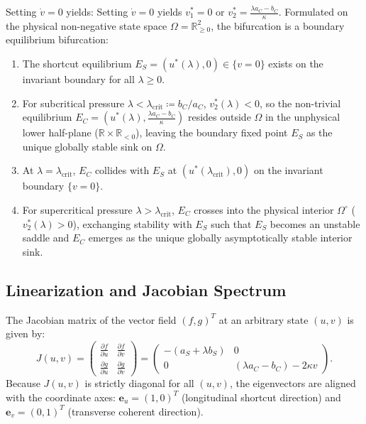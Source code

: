 \documentclass{article}
\theoremstyle{plain}
\theoremstyle{definition}
\begin{document}
Setting $\dot{v} = 0$ yields:
Setting $\dot{v} = 0$ yields $v_1^* = 0$ or $v_2^* = \frac{\lambda a_C - b_C}{\kappa}$. Formulated on the physical non-negative state space $\Omega = \mathbb{R}_{\ge 0}^2$, the bifurcation is a boundary equilibrium bifurcation:
\begin{enumerate}[leftmargin=*,noitemsep]
    \item The shortcut equilibrium $E_S = (u^*(\lambda), 0) \in \{v=0\}$ exists on the invariant boundary for all $\lambda \ge 0$.
    \item For subcritical pressure $\lambda < \lambda_{\text{crit}} \coloneqq b_C / a_C$, $v_2^*(\lambda) < 0$, so the non-trivial equilibrium $E_C = \left( u^*(\lambda), \frac{\lambda a_C - b_C}{\kappa} \right)$ resides outside $\Omega$ in the unphysical lower half-plane ($\mathbb{R} \times \mathbb{R}_{<0}$), leaving the boundary fixed point $E_S$ as the unique globally stable sink on $\Omega$.
    \item At $\lambda = \lambda_{\text{crit}}$, $E_C$ collides with $E_S$ at $(u^*(\lambda_{\text{crit}}), 0)$ on the invariant boundary $\{v=0\}$.
    \item For supercritical pressure $\lambda > \lambda_{\text{crit}}$, $E_C$ crosses into the physical interior $\Omega^\circ$ ($v_2^*(\lambda) > 0$), exchanging stability with $E_S$ such that $E_S$ becomes an unstable saddle and $E_C$ emerges as the unique globally asymptotically stable interior sink.
\end{enumerate}
\subsection{Linearization and Jacobian Spectrum}
The Jacobian matrix of the vector field $(f, g)^T$ at an arbitrary state $(u, v)$ is given by:
\begin{equation}
    J(u, v) = \begin{pmatrix}
        \frac{\partial f}{\partial u} & \frac{\partial f}{\partial v} \\
        \frac{\partial g}{\partial u} & \frac{\partial g}{\partial v}
    \end{pmatrix} = \begin{pmatrix}
        -(a_S + \lambda b_S) & 0 \\
        0 & (\lambda a_C - b_C) - 2\kappa v
    \end{pmatrix}.
\end{equation}
Because $J(u, v)$ is strictly diagonal for all $(u, v)$, the eigenvectors are aligned with the coordinate axes: $\mathbf{e}_u = (1, 0)^T$ (longitudinal shortcut direction) and $\mathbf{e}_v = (0, 1)^T$ (transverse coherent direction).
\end{document}
